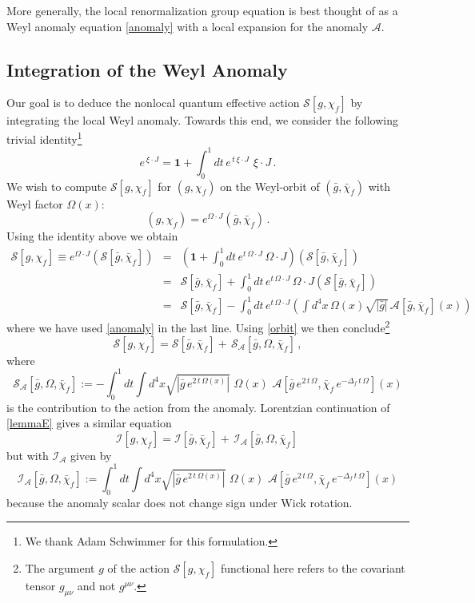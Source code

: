 \documentclass[12pt,a4paper]{article}
\newcommand{\bea}{\begin{eqnarray}}
\newcommand{\eea}{\end{eqnarray}}
\newcommand{\be}{\begin{equation}}
\newcommand{\ee}{\end{equation}}
\newcommand{\cA}{\mathcal{A}}
\newcommand{\cI}{\mathcal{I}}
\newcommand{\cS}{\mathcal{S}}
\newcommand{\m}{\mu}
\newcommand{\n}{\nu}
\newcommand{\D}{\Delta}
\renewcommand{\O}{\Omega}
\newcommand{\1}{{\textbf{1}}}
\newcommand{\+}{{\,+ \,}}
\begin{document}
More generally, the local renormalization group equation is best thought of as a Weyl anomaly equation \eqref{anomaly} with a local expansion for the anomaly $\cA$. 

\subsection{Integration of the Weyl Anomaly \label{Integration}} 

Our goal is to deduce the nonlocal quantum effective action $\cS[g,\chi_f]$ by integrating the local  Weyl anomaly.  Towards this end, we consider the following trivial identity\footnote{We thank Adam Schwimmer for this formulation.}
\be
e^{\,\xi \cdot J}  = \textbf{1} + \int_{0}^{1} dt \,e^{\,t\, \xi \cdot J} \,\, \xi \cdot J \, .
\ee
We wish to compute $\cS [g, \chi_{f}]$ for 
$(g, \chi_{f})$ on the Weyl-orbit of $(\bar g, \bar \chi_{f})$ with Weyl factor $\Omega(x)$:
\be\label{orbit}
(g, \chi_{f}) = e^{\O \cdot J} (\bar g, \bar \chi_{f})\, .
\ee
 Using the identity above we obtain
\bea
\cS [g, \chi_{f}] \equiv e^{\O \cdot J} \left( \cS [\bar g, \bar \chi_{f}] \right)  &=&  \left( \textbf{1}  + \int_{0}^{1} dt\,e^{t\, \O \cdot J } \, \O \cdot J \right)\left( \cS [\bar g, \bar \chi_{f}]\right)\\
 &=&  \cS [\bar g, \bar \chi_{f}]  + \int_{0}^{1} dt \,e^{t\, \O \cdot J} \, \O \cdot J \left(\cS [\bar g, \bar \chi_{f}] \right)\\
 &=&  \cS [\bar g, \bar \chi_{f}]  - \int_{0}^{1} dt \,e^{t\, \O \cdot J} \left(\int d^4x \,\O(x)\sqrt{|\bar g|} \, \mathcal{A} [\bar g, \bar \chi_{f}] (x) \right)
\eea
where we have used \eqref{anomaly} in the last line. Using \eqref{orbit} we then conclude\footnote{The argument $g$ of  the action $\cS[g, \chi_{f}]$ functional here refers to the covariant tensor $g_{\m\n}$ and not $g^{\m\n}$.}
\be\label{lemmaE}
\cS [g, \chi_{f}] =  \cS [\bar g, \bar \chi_{f}]  + \,  \cS_{\cA}[\bar g, \O, \bar \chi_{f}] \, ,
 \ee
 where 
 \be\label{lemmaE2}
 \cS_{\cA}[\bar g, \O, \bar \chi_{f}] :=-\int_{0}^{1} dt \int d^4x \sqrt{|\bar g \,e^{2\, t\, \O(x)}|} \,\, \O (x) \,\, \mathcal{A} [\bar g \,e^{2\, t\, \O}, \bar \chi_{f} \,e^{- \D_{f}\, t\, \O}](x)
 \ee
 is the contribution to the action from the anomaly. 
Lorentzian continuation of \eqref{lemmaE} gives a similar equation 
 \be\label{lemmaL}
\cI [g, \chi_{f}] =  \cI [\bar g, \bar \chi_{f}]  + \,  \cI_{\cA}[\bar g, \Omega, \bar \chi_{f}] \, 
 \ee
 but with $\cI_{\cA}$ given by
 \be\label{lemmaL2}
 \cI_{\cA}[\bar g, \O, \bar \chi_{f}] :=\int_{0}^{1} dt \int d^4x \sqrt{|\bar g \,e^{2\, t\, \O(x)}|} \,\, \O (x) \,\, \mathcal{A} [\bar g \,e^{2\, t\, \O}, \bar \chi_{f} \,e^{- \D_{f}\, t\, \O}](x)
 \ee
 because the anomaly scalar does not change sign under Wick rotation.
 
\end{document}
